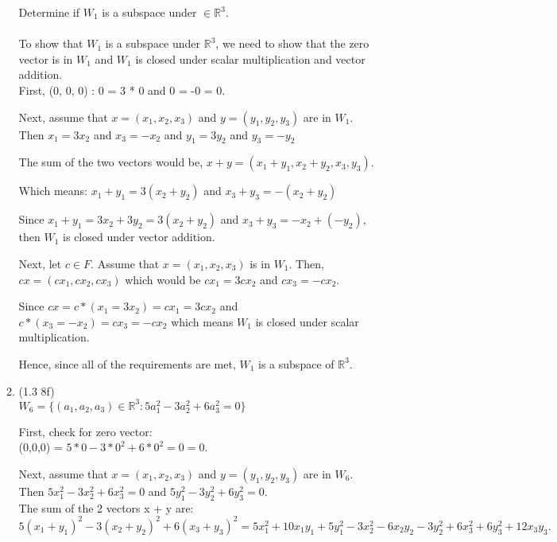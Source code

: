 \documentclass[12pt]{article}
\begin{document}
\begin{enumerate}
\begin{enumerate}[label=(\alph*)]
        Determine if $W_1$ is a subspace under $\in \mathbb{R}^3$. \\ \\
        To show that $W_1$ is a subspace under $\mathbb{R}^3$, we need to show that the zero vector is in $W_1$ and $W_1$ is closed under scalar multiplication and vector addition. \\

        First, (0, 0, 0) : 0 = 3 * 0 and 0 = -0 = 0. 

        Next, assume that $x = (x_1, x_2, x_3)$ and $y = (y_1, y_2, y_3)$ are in $W_1$. Then $x_1 = 3x_2$ and $x_3 = -x_2$ and $y_1 = 3y_2$ and $y_3 = -y_2$
        
        The sum of the two vectors would be, $x + y = (x_1 + y_1, x_2 + y_2, x_3, y_3)$.

        Which means: $x_1 + y_1 = 3(x_2 + y_2)$ and $x_3 + y_3 = -(x_2 + y_2)$

        Since $x_1 + y_1 = 3x_2 + 3y_2 = 3(x_2 + y_2)$ and $x_3 + y_3 = -x_2 + (-y_2),$ then $W_1$ is closed under vector addition. 

        Next, let $c \in F$. Assume that $x = (x_1, x_2, x_3)$ is in $W_1$. 
        Then, $cx = (cx_1, cx_2, cx_3)$ which would be $cx_1 = 3cx_2$ and $cx_3 = -cx_2$. 

        Since $cx = c * (x_1 = 3x_2) = cx_1 = 3cx_2$ and $c * (x_3 = -x_2) = cx_3 = -cx_2$ which means $W_1$ is closed under scalar multiplication.
        
        Hence, since all of the requirements are met, $W_1$ is a subspace of $\mathbb{R}^3$. 

        \item (1.3 8f) \\

        $W_6 = \{(a_1, a_2, a_3) \in \mathbb{R}^3 : 5a_1^2 - 3a_2^2 + 6a_3^2 = 0 \}$

        First, check for zero vector:
        \\ (0,0,0) = $5 * 0 - 3 * 0^2 + 6 * 0^2 = 0 = 0$. 

        Next, assume that $x = (x_1, x_2, x_3)$ and $y = (y_1, y_2, y_3)$ are in $W_6$. Then $5x_1^2 - 3x_2^2 + 6x_3^2 = 0$ and $5y_1^2 - 3y_2^2 + 6y_3^2 = 0$. \\

        The sum of the 2 vectors x + y are: $5(x_1 + y_1)^2 - 3(x_2 + y_2)^2 + 6(x_3 + y_3)^2 = 5x_1^2 + 10x_1y_1 + 5y_1^2 - 3x_2^2 - 6x_2y_2 - 3y_2^2 + 6x_3^2 + 6y_3^2 + 12x_3y_3. $


\end{enumerate}
\end{enumerate}
\end{document}
